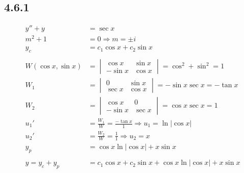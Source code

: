 \documentclass{article}
\begin{document}
\subsection{4.6.1}
\begin{align*}
    y''+y &= \sec x\\
    m^2+1 &= 0 \Rightarrow m = \pm i\\
    y_c &= c_1\cos x+c_2\sin x\\\\
    W(\cos x,\sin x)  &= \begin{vmatrix}\cos x & \sin x \\ -\sin x & \cos x \end{vmatrix} = \cos ^2+\sin ^2 = 1\\
    W_1 &= \begin{vmatrix} 0 & \sin x \\ \sec x & \cos x\end{vmatrix} = -\sin x \sec x = -\tan x\\
    W_2 &= \begin{vmatrix} \cos x & 0\\ -\sin x & \sec x\end{vmatrix} = \cos x \sec x = 1\\
    u_1' &= \frac{W_1}{W}= \frac{-\tan x}{1} \Rightarrow u_1 =  \ln\left|\cos x\right|\\
    u_2' &= \frac{W_2}{W}= \frac{1}{1} \Rightarrow u_2 = x\\
    y_p &= \cos x\ln\left|\cos x\right|+x\sin x\\\\
    y  = y_c+y_p&= c_1\cos x+c_2\sin x+\cos x \ln\left|\cos x\right|+x\sin x
\end{align*}
\end{document}
